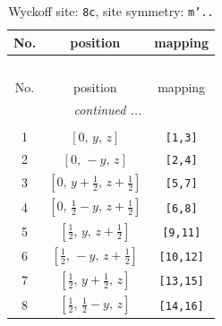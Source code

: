 \documentclass[fleqn,8pt]{jsarticle}
\begin{document}
\begin{longtable}{ccc}
\caption{Wyckoff site: {\tt 8c}, site symmetry: {\tt m'..}}
 \\
 \hline \hline
No. & position & mapping \\ \hline \endfirsthead

\multicolumn{2}{l}{\tablename\ \thetable{}} \\
 \hline \hline
No. & position & mapping \\ \hline \endhead

 \hline \hline
\multicolumn{2}{r}{\footnotesize\it continued ...} \\ \endfoot

 \hline \hline
\multicolumn{2}{r}{} \\ \endlastfoot

1 & $\left[ 0,\, y,\, z \right]$ & {\tt [1,3]} \\ \hline
2 & $\left[ 0,\, - y,\, z \right]$ & {\tt [2,4]} \\ \hline
3 & $\left[ 0,\, y + \frac{1}{2},\, z + \frac{1}{2} \right]$ & {\tt [5,7]} \\ \hline
4 & $\left[ 0,\, \frac{1}{2} - y,\, z + \frac{1}{2} \right]$ & {\tt [6,8]} \\ \hline
5 & $\left[ \frac{1}{2},\, y,\, z + \frac{1}{2} \right]$ & {\tt [9,11]} \\ \hline
6 & $\left[ \frac{1}{2},\, - y,\, z + \frac{1}{2} \right]$ & {\tt [10,12]} \\ \hline
7 & $\left[ \frac{1}{2},\, y + \frac{1}{2},\, z \right]$ & {\tt [13,15]} \\ \hline
8 & $\left[ \frac{1}{2},\, \frac{1}{2} - y,\, z \right]$ & {\tt [14,16]} \\
\end{longtable}
\renewcommand{\arraystretch}{1.2}
\end{document}
